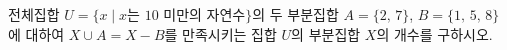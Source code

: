 전체집합 $U=\{x \mid x$는 $10$ 미만의 자연수$\}$의 두 부분집합 $A=\{2,\,7\}$, $B=\{1,\,5,\,8\}$에 대하여 $X\cup A=X-B$를 만족시키는 집합 $U$의 부분집합 $X$의 개수를 구하시오.

